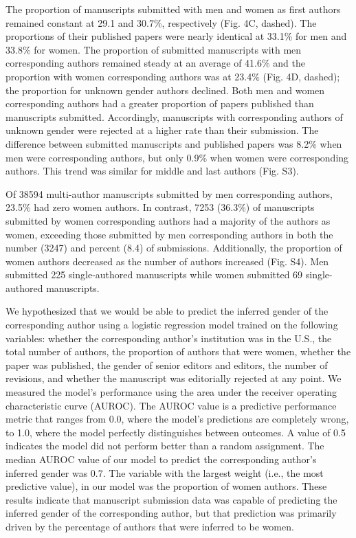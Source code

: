 \documentclass[11pt,]{article}
\begin{document}
The proportion of manuscripts submitted with men and women as first
authors remained constant at 29.1 and 30.7\%, respectively (Fig. 4C,
dashed). The proportions of their published papers were nearly identical
at 33.1\% for men and 33.8\% for women. The proportion of submitted
manuscripts with men corresponding authors remained steady at an average
of 41.6\% and the proportion with women corresponding authors was at
23.4\% (Fig. 4D, dashed); the proportion for unknown gender authors
declined. Both men and women corresponding authors had a greater
proportion of papers published than manuscripts submitted. Accordingly,
manuscripts with corresponding authors of unknown gender were rejected
at a higher rate than their submission. The difference between submitted
manuscripts and published papers was 8.2\% when men were corresponding
authors, but only 0.9\% when women were corresponding authors. This
trend was similar for middle and last authors (Fig. S3).

Of 38594 multi-author manuscripts submitted by men corresponding
authors, 23.5\% had zero women authors. In contrast, 7253 (36.3\%) of
manuscripts submitted by women corresponding authors had a majority of
the authors as women, exceeding those submitted by men corresponding
authors in both the number (3247) and percent (8.4) of submissions.
Additionally, the proportion of women authors decreased as the number of
authors increased (Fig. S4). Men submitted 225 single-authored
manuscripts while women submitted 69 single-authored manuscripts.

We hypothesized that we would be able to predict the inferred gender of
the corresponding author using a logistic regression model trained on
the following variables: whether the corresponding author's institution
was in the U.S., the total number of authors, the proportion of authors
that were women, whether the paper was published, the gender of senior
editors and editors, the number of revisions, and whether the manuscript
was editorially rejected at any point. We measured the model's
performance using the area under the receiver operating characteristic
curve (AUROC). The AUROC value is a predictive performance metric that
ranges from 0.0, where the model's predictions are completely wrong, to
1.0, where the model perfectly distinguishes between outcomes. A value
of 0.5 indicates the model did not perform better than a random
assignment. The median AUROC value of our model to predict the
corresponding author's inferred gender was 0.7. The variable with the
largest weight (i.e., the most predictive value), in our model was the
proportion of women authors. These results indicate that manuscript
submission data was capable of predicting the inferred gender of the
corresponding author, but that prediction was primarily driven by the
percentage of authors that were inferred to be women.
\end{document}
